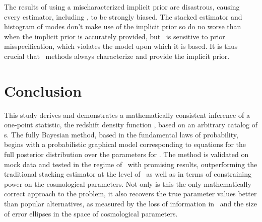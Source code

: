 The results of using a mischaracterized implicit prior are disastrous, causing every estimator, including \Chippr, to be strongly biased.
The stacked estimator and histogram of modes don't make use of the implicit prior so do no worse than when the implicit prior is accurately provided, but \Chippr\ is sensitive to prior misspecification, which violates the model upon which it is based.
It is thus crucial that \pzpdf\ methods always characterize and provide the implicit prior.


\section{Conclusion}

This study derives and demonstrates a mathematically consistent inference of a one-point statistic, the redshift density function \nz, based on an arbitrary catalog of \pzpdf s.  
The fully Bayesian method, based in the fundamental laws of probability, begins with a probabilistic graphical model corresponding to equations for the full posterior distribution over the parameters for \nz.  
The method is validated on mock data and tested in the regime of \lsst\ with promising results, outperforming the traditional stacking estimator at the level of \nz\ as well as in terms of constraining power on the cosmological parameters.
Not only is this the only mathematically correct approach to the problem, it also recovers the true parameter values better than popular alternatives, as measured by the loss of information in \nz\ and the size of error ellipses in the space of cosmological parameters.


